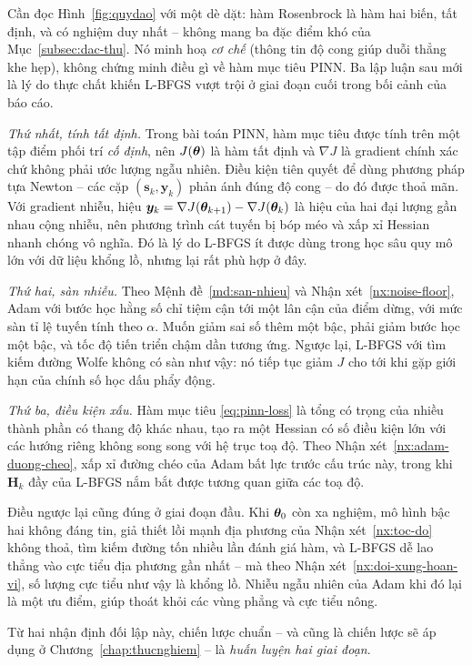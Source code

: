 Cần đọc Hình~\ref{fig:quydao} với một dè dặt: hàm Rosenbrock là hàm hai biến, tất
định, và có nghiệm duy nhất -- không mang ba đặc điểm khó của
Mục~\ref{subsec:dac-thu}. Nó minh hoạ \emph{cơ chế} (thông tin độ cong giúp duỗi
thẳng khe hẹp), không chứng minh điều gì về hàm mục tiêu PINN. Ba lập luận sau
mới là lý do thực chất khiến L-BFGS vượt trội ở giai đoạn cuối trong bối cảnh của
báo cáo.
 
\emph{Thứ nhất, tính tất định.} Trong bài toán PINN, hàm mục tiêu được tính trên
một tập điểm phối trí \emph{cố định}, nên $J(\bm{\theta})$ là hàm tất định và
$\nabla J$ là gradient chính xác chứ không phải ước lượng ngẫu nhiên. Điều kiện
tiên quyết để dùng phương pháp tựa Newton -- các cặp $(\bm{s}_k,\bm{y}_k)$ phản
ánh đúng độ cong -- do đó được thoả mãn. Với gradient nhiễu, hiệu
$\bm{y}_k = \nabla J(\bm{\theta}_{k+1}) - \nabla J(\bm{\theta}_k)$ là hiệu của hai đại
lượng gần nhau cộng nhiễu, nên phương trình cát tuyến bị bóp méo và xấp xỉ
Hessian nhanh chóng vô nghĩa. Đó là lý do L-BFGS ít được dùng trong học sâu quy
mô lớn với dữ liệu khổng lồ, nhưng lại rất phù hợp ở đây.
 
\emph{Thứ hai, sàn nhiễu.} Theo Mệnh đề~\ref{md:san-nhieu} và
Nhận xét~\ref{nx:noise-floor}, Adam với bước học hằng số chỉ tiệm cận tới một lân
cận của điểm dừng, với mức sàn tỉ lệ tuyến tính theo $\alpha$. Muốn giảm sai số
thêm một bậc, phải giảm bước học một bậc, và tốc độ tiến triển chậm dần tương
ứng. Ngược lại, L-BFGS với tìm kiếm đường Wolfe không có sàn như vậy: nó tiếp tục
giảm $J$ cho tới khi gặp giới hạn của chính số học dấu phẩy động.
 
\emph{Thứ ba, điều kiện xấu.} Hàm mục tiêu \eqref{eq:pinn-loss} là tổng có trọng
của nhiều thành phần có thang độ khác nhau, tạo ra một Hessian có số điều kiện
lớn với các hướng riêng không song song với hệ trục toạ độ. Theo
Nhận xét~\ref{nx:adam-duong-cheo}, xấp xỉ đường chéo của Adam bất lực trước cấu
trúc này, trong khi $\bm{H}_k$ đầy của L-BFGS nắm bắt được tương quan giữa các
toạ độ.
 
Điều ngược lại cũng đúng ở giai đoạn đầu. Khi $\bm{\theta}_0$ còn xa nghiệm, mô hình
bậc hai không đáng tin, giả thiết lồi mạnh địa phương của
Nhận xét~\ref{nx:toc-do} không thoả, tìm kiếm đường tốn nhiều lần đánh giá hàm,
và L-BFGS dễ lao thẳng vào cực tiểu địa phương gần nhất -- mà theo
Nhận xét~\ref{nx:doi-xung-hoan-vi}, số lượng cực tiểu như vậy là khổng lồ. Nhiễu
ngẫu nhiên của Adam khi đó lại là một ưu điểm, giúp thoát khỏi các vùng phẳng và
cực tiểu nông.
 
Từ hai nhận định đối lập này, chiến lược chuẩn -- và cũng là chiến lược sẽ áp
dụng ở Chương~\ref{chap:thucnghiem} -- là \emph{huấn luyện hai giai đoạn}.
 

